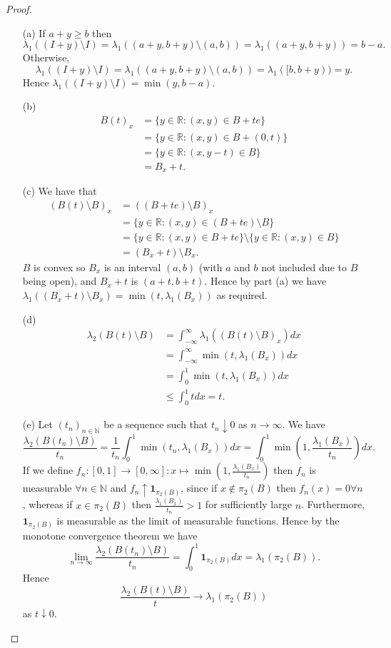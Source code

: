 \documentclass{article}
\begin{document}
\begin{proof}
\begin{enumerate}
    \item[(a)] If $a+y\geq b$ then \[\lambda_1((I+y)\setminus I)=\lambda_1((a+y,b+y)\setminus(a,b))=\lambda_1((a+y,b+y))=b-a.\]
    Otherwise,\[\lambda_1((I+y)\setminus I)=\lambda_1((a+y,b+y)\setminus(a,b))=\lambda_1([b,b+y))=y.\] Hence $\lambda_1((I+y)\setminus I)=\min(y,b-a)$.
    \item[(b)] \begin{align*}B(t)_x&=\{y\in\mathbb{R}:(x,y)\in B+te\}\\&=\{y\in\mathbb{R}:(x,y)\in B+(0,t)\}\\&=\{y\in\mathbb{R}:(x,y-t)\in B\}\\&=B_x+t.\end{align*}
    \item[(c)] We have that \begin{align*}(B(t)\setminus B)_x&=((B+te)\setminus B)_x\\&=\{y\in\mathbb{R}:(x,y)\in (B+te)\setminus B\}\\&=\{y\in\mathbb{R}:(x,y)\in B+te\}\setminus\{y\in\mathbb{R}:(x,y)\in B\}\\&=(B_x+t)\setminus B_x.\end{align*}$B$ is convex so $B_x$ is an interval $(a,b)$ (with $a$ and $b$ not included due to $B$ being open), and $B_x+t$ is $(a+t,b+t)$. Hence by part (a) we have $\lambda_1((B_x+t)\setminus B_x)=\min(t,\lambda_1(B_x))$ as required.
    \item[(d)] \begin{align*}\lambda_2(B(t)\setminus B)&=\int_{-\infty}^\infty\lambda_1((B(t)\setminus B)_x)dx\\&=\int_{-\infty}^\infty\min(t,\lambda_1(B_x))dx\\&=\int_0^1\min(t,\lambda_1(B_x))dx\\&\leq\int_0^1 tdx=t.\end{align*}
    \item[(e)] Let $(t_n)_{n\in\mathbb{N}}$ be a sequence such that $t_n\downarrow 0$ as $n\to\infty$. We have \[\frac{\lambda_2(B(t_n)\setminus B)}{t_n}=\frac{1}{t_n}\int_0^1\min(t_n,\lambda_1(B_x))dx=\int_0^1\min(1,\frac{\lambda_1(B_x)}{t_n})dx.\] If we define $f_n:[0,1]\to[0,\infty]:x\mapsto\min(1,\frac{\lambda_1(B_x)}{t_n})$ then $f_n$ is measurable $\forall n\in\mathbb{N}$ and $f_n\uparrow\mathbf{1}_{\pi_2(B)}$, since if $x\not\in\pi_2(B)$ then $f_n(x)=0\forall n$, whereas if $x\in\pi_2(B)$ then $\frac{\lambda_1(B_x)}{t_n}>1$ for sufficiently large $n$. Furthermore, $\mathbf{1}_{\pi_2(B)}$ is measurable as the limit of measurable functions. Hence by the monotone convergence theorem we have\[\lim_{n\to\infty}\frac{\lambda_2(B(t_n)\setminus B)}{t_n}=\int_0^1\mathbf{1}_{\pi_2(B)}dx=\lambda_1(\pi_2(B)).\] Hence \[\frac{\lambda_2(B(t)\setminus B)}{t}\to\lambda_1(\pi_2(B))\] as $t\downarrow 0$.
\end{enumerate}
\end{proof}
\end{document}
